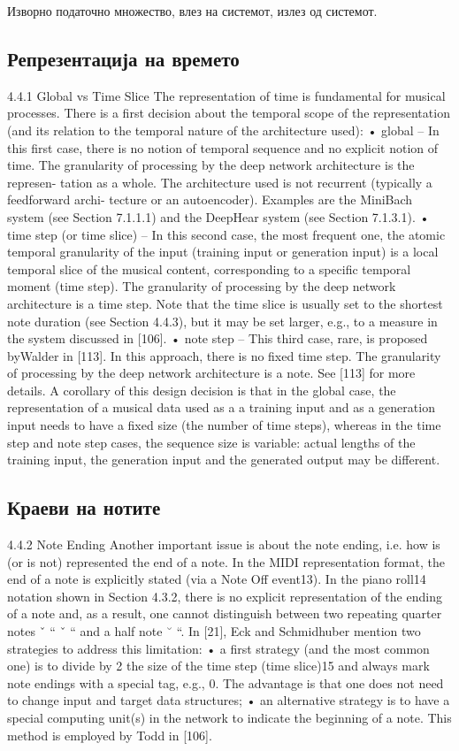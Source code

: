 Изворно податочно множество, влез на системот, излез од системот. 

\subsection{Репрезентација на времето}
4.4.1 Global vs Time Slice
The representation of time is fundamental for musical processes. There is a first decision about the temporal scope of the representation (and its relation to the temporal nature of the architecture used):
• global – In this first case, there is no notion of temporal sequence and no explicit notion of time. The granularity of processing by the deep network architecture is the represen-
tation as a whole. The architecture used is not recurrent (typically a feedforward archi- tecture or an autoencoder). Examples are the MiniBach system (see Section 7.1.1.1) and the DeepHear system (see Section 7.1.3.1).
• time step (or time slice) – In this second case, the most frequent one, the atomic temporal granularity of the input (training input or generation input) is a local temporal slice
of the musical content, corresponding to a specific temporal moment (time step). The granularity of processing by the deep network architecture is a time step. Note that the time slice is usually set to the shortest note duration (see Section 4.4.3), but it may be set larger, e.g., to a measure in the system discussed in [106].
• note step – This third case, rare, is proposed byWalder in [113]. In this approach, there is no fixed time step. The granularity of processing by the deep network architecture is
a note. See [113] for more details. A corollary of this design decision is that in the global case, the representation of a
musical data used as a a training input and as a generation input needs to have a fixed size (the number of time steps), whereas in the time step and note step cases, the sequence size is variable: actual lengths of the training input, the generation input and the generated output may be different.

\subsection{Краеви на нотите}
4.4.2 Note Ending
Another important issue is about the note ending, i.e. how is (or is not) represented the end of a note. In the MIDI representation format, the end of a note is explicitly stated (via a Note Off event13). In the piano roll14 notation shown in Section 4.3.2, there is no explicit representation of the ending of a note and, as a result, one cannot distinguish between two
repeating quarter notes ˇ “ ˇ “ and a half note ˘ “. In [21], Eck and Schmidhuber mention two strategies to address this limitation:
• a first strategy (and the most common one) is to divide by 2 the size of the time step (time slice)15 and always mark note endings with a special tag, e.g., 0. The advantage is
that one does not need to change input and target data structures;
• an alternative strategy is to have a special computing unit(s) in the network to indicate the beginning of a note. This method is employed by Todd in [106].

